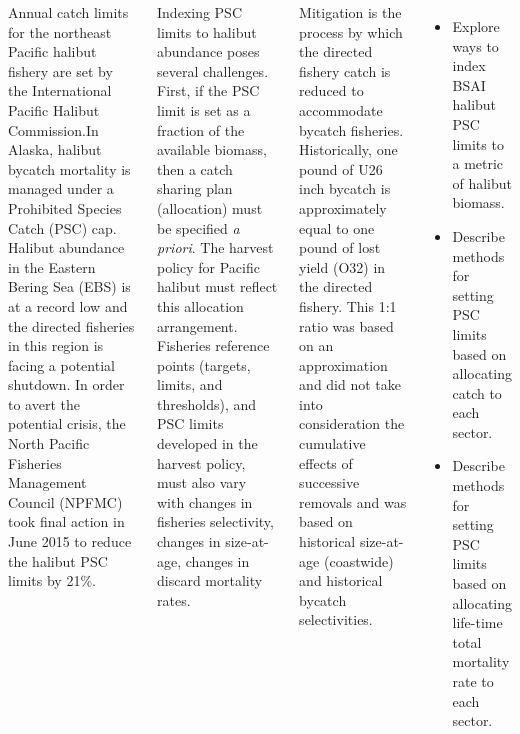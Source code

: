 \documentclass[24pt, a0paper, landscape]{tikzposter}
\begin{document}
\begin{columns}
	{
		Annual catch limits for the northeast Pacific halibut fishery are set by the International Pacific Halibut Commission.In Alaska, halibut bycatch mortality is managed under a Prohibited Species Catch (PSC) cap.  Halibut abundance in the Eastern Bering Sea (EBS) is at a record low and the directed fisheries in this region is facing a potential shutdown.  In order to avert the potential crisis, the North Pacific Fisheries Management Council (NPFMC) took final action in June 2015 to reduce the halibut PSC limits by 21\%. 

		Indexing PSC limits to halibut abundance poses several challenges.  First, if the PSC limit is set as a fraction of the available biomass, then a catch sharing plan (allocation) must be specified \emph{a priori}.  The harvest policy for Pacific halibut must reflect this allocation arrangement.  Fisheries reference points (targets, limits, and thresholds), and PSC limits developed in the harvest policy, must also vary with changes in fisheries selectivity, changes in size-at-age, changes in discard mortality rates.

		Mitigation is the process by which the directed fishery catch is reduced to accommodate bycatch fisheries.  Historically, one pound of U26 inch bycatch is approximately equal to one pound of lost yield (O32) in the directed fishery.  This 1:1 ratio was based on an approximation and did not take into consideration the cumulative effects of successive removals and was based on historical size-at-age (coastwide) and historical bycatch selectivities.
	}
	{
		
		\begin{itemize}
			\item Explore ways to index BSAI halibut PSC limits to a metric of halibut biomass.
			\item Describe methods for setting PSC limits based on allocating catch to each sector.
			\item Describe methods for setting PSC limits based on allocating life-time total mortality rate to each sector.
		\end{itemize}
		 
	}

 

\end{columns}
\end{document}
